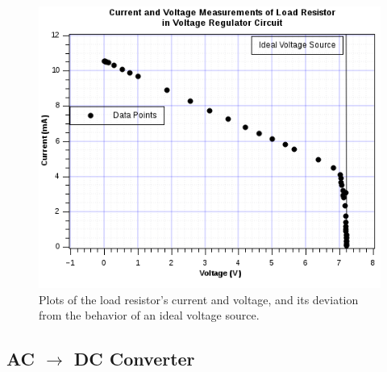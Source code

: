 \documentclass[twocolumn,english]{IEEEtran}
\begin{document}
\begin{figure}[H]
  \begin{centering}
  \begin{center}
  \includegraphics[width=\linewidth]{./voltage_reg.png}
  \caption{Plots of the load resistor's current and voltage, and its deviation from the behavior of an ideal voltage source.}
  \label{fig:voltage_reg}
  \end{center}
  \par\end{centering}
  \end{figure}






\subsection{\textbf{AC $\rightarrow$ DC Converter}}
\end{document}
